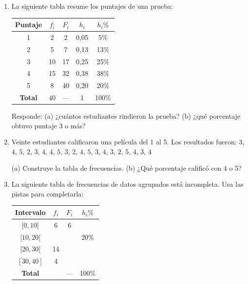 \documentclass[11pt, letterpaper]{article}
\begin{document}
\begin{enumerate}[label=\textbf{\arabic*.}, leftmargin=*]
  \item La siguiente tabla resume los puntajes de una prueba:
  \begin{center}
  \renewcommand{\arraystretch}{1.3}
  \begin{tabular}{c c c c c}
  \toprule
  Puntaje & $f_i$ & $F_i$ & $h_i$ & $h_i\%$\\
  \midrule
  1 & 2 & 2 & 0{,}05 & 5\%\\
  2 & 5 & 7 & 0{,}13 & 13\%\\
  3 & 10 & 17 & 0{,}25 & 25\%\\
  4 & 15 & 32 & 0{,}38 & 38\%\\
  5 & 8 & 40 & 0{,}20 & 20\%\\
  \midrule
  \textbf{Total} & 40 & --- & 1 & 100\%\\
  \bottomrule
  \end{tabular}
  \end{center}
  Responde: (a) ¿cuántos estudiantes rindieron la prueba? (b) ¿qué porcentaje obtuvo puntaje 3 o más?
  \vspace{2.8cm}

  \item Veinte estudiantes calificaron una película del 1 al 5. Los resultados fueron:
  $3$, $4$, $5$, $2$, $3$, $4$, $4$, $5$, $3$, $2$, $4$, $5$, $3$, $4$, $3$, $2$, $5$, $4$, $3$, $4$

  (a) Construye la tabla de frecuencias. (b) ¿Qué porcentaje calificó con 4 o 5?
  \vspace{2.8cm}

  \item La siguiente tabla de frecuencias de datos agrupados está incompleta. Usa las pistas para completarla:
  \begin{center}
  \renewcommand{\arraystretch}{1.3}
  \begin{tabular}{c c c c}
  \toprule
  Intervalo & $f_i$ & $F_i$ & $h_i\%$\\
  \midrule
  $[0,10[$   & 6  & 6  & \\
  $[10,20[$  &    &    & 20\%\\
  $[20,30[$  & 14 &    & \\
  $[30,40]$  & 4  &    & \\
  \midrule
  \textbf{Total} &  & --- & 100\%\\
  \bottomrule
  \end{tabular}
  \end{center}
\end{enumerate}
\end{document}

